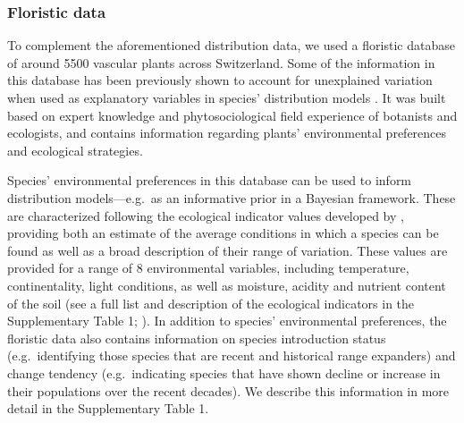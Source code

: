 \documentclass[11pt, a4paper]{article}
\begin{document}
\subsubsection*{Floristic data}
To complement the aforementioned distribution data, we used a floristic database of around 5500 vascular plants across Switzerland. Some of the information in this database has been previously shown to account for unexplained variation when used as explanatory variables in species' distribution models \citep{scherrerEcologicalIndicatorValues2019}.  It was built based on expert knowledge and phytosociological field experience of botanists and ecologists, and contains information regarding plants' environmental preferences and ecological strategies. 

Species' environmental preferences in this database can be used to inform distribution models---e.g.~as an informative prior in a Bayesian framework. These are characterized following the ecological indicator values developed by \citet{landoltFloraIndicativaOkologische2010}, providing both an estimate of the average conditions in which a species can be found as well as a broad description of their range of variation. These values are provided for a range of 8 environmental variables, including temperature, continentality, light conditions, as well as moisture, acidity and nutrient content of the soil (see a full list and description of the ecological indicators in the Supplementary Table 1; \citealt{landoltFloraIndicativaOkologische2010}). In addition to species' environmental preferences, the floristic data also contains information on species introduction status (e.g.~identifying those species that are recent and historical range expanders) and change tendency (e.g.~indicating species that have shown decline or increase in their populations over the recent decades). We describe this information in more detail in the Supplementary Table 1.

\end{document}
